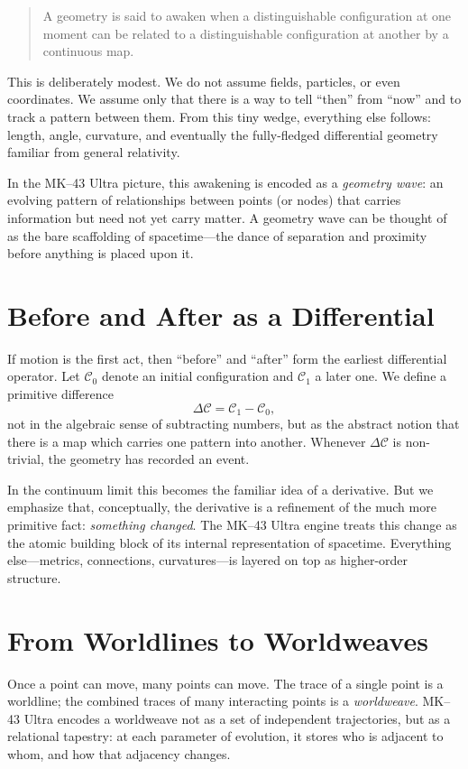 \begin{quote}
A geometry is said to awaken when a distinguishable configuration at one moment
can be related to a distinguishable configuration at another by a continuous
map.
\end{quote}

This is deliberately modest. We do not assume fields, particles, or even
coordinates. We assume only that there is a way to tell ``then'' from ``now''
and to track a pattern between them. From this tiny wedge, everything else
follows: length, angle, curvature, and eventually the fully-fledged
differential geometry familiar from general relativity.

In the MK--43 Ultra picture, this awakening is encoded as a \emph{geometry
wave}: an evolving pattern of relationships between points (or nodes) that
carries information but need not yet carry matter. A geometry wave can be
thought of as the bare scaffolding of spacetime---the dance of separation and
proximity before anything is placed upon it.

\section{Before and After as a Differential}
If motion is the first act, then ``before'' and ``after'' form the earliest
differential operator. Let $\mathcal{C}_0$ denote an initial configuration and
$\mathcal{C}_1$ a later one. We define a primitive difference
\begin{equation}
\Delta \mathcal{C} = \mathcal{C}_1 - \mathcal{C}_0,
\end{equation}
not in the algebraic sense of subtracting numbers, but as the abstract notion
that there is a map which carries one pattern into another. Whenever
$\Delta \mathcal{C}$ is non-trivial, the geometry has recorded an event.

In the continuum limit this becomes the familiar idea of a derivative. But we
emphasize that, conceptually, the derivative is a refinement of the much more
primitive fact: \emph{something changed}. The MK--43 Ultra engine treats this
change as the atomic building block of its internal representation of
spacetime. Everything else---metrics, connections, curvatures---is layered on
top as higher-order structure.

\section{From Worldlines to Worldweaves}
Once a point can move, many points can move. The trace of a single point is a
worldline; the combined traces of many interacting points is a
\emph{worldweave}. MK--43 Ultra encodes a worldweave not as a set of
independent trajectories, but as a relational tapestry: at each parameter of
evolution, it stores who is adjacent to whom, and how that adjacency changes.

